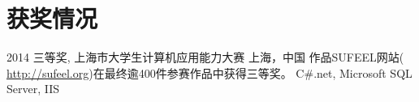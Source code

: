\documentclass[]{friggeri-cv-cn} %
\begin{document}

\section{获奖情况}

\begin{entrylist}
\entry
{2014}
{三等奖, 上海市大学生计算机应用能力大赛}
{上海，中国}
{作品SUFEEL网站({\color{lightgray} {\url{http://sufeel.org}}})在最终逾400件参赛作品中获得三等奖。{\footnotesize{} C\#.net, Microsoft SQL Server, IIS}}
\end{entrylist}

\end{document}

